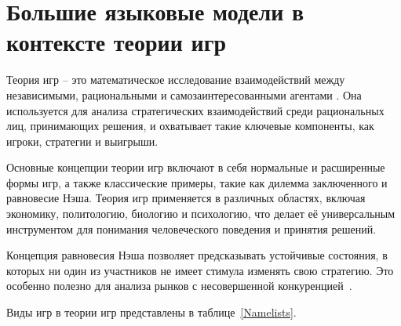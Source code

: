 \section{Большие языковые модели в контексте теории игр}

Теория игр -- это математическое исследование взаимодействий между независимыми, рациональными и самозаинтересованными агентами \cite{LeytonBrown2008}. Она используется для анализа стратегических взаимодействий среди рациональных лиц, принимающих решения, и охватывает такие ключевые компоненты, как игроки, стратегии и выигрыши.

Основные концепции теории игр включают в себя нормальные и расширенные формы игр, а также классические примеры, такие как дилемма заключенного и равновесие Нэша. Теория игр применяется в различных областях, включая экономику, политологию, биологию и психологию, что делает её универсальным инструментом для понимания человеческого поведения и принятия решений.
 
Концепция равновесия Нэша позволяет предсказывать устойчивые состояния, в которых ни один из участников не имеет стимула изменять свою стратегию. Это особенно полезно для анализа рынков с несовершенной конкуренцией~\cite{Kumar2024}.

Виды игр в теории игр представлены в таблице~\ref{Namelists}.


